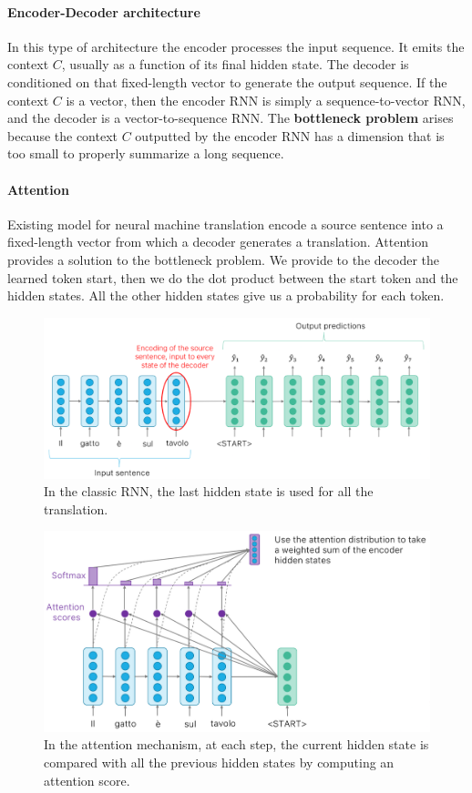 \documentclass{article}
\begin{document}
\paragraph{Encoder-Decoder architecture}
In this type of architecture the encoder processes the input sequence.
It emits the context $C$, usually as a function of its final hidden state.
The decoder is conditioned on that fixed-length vector to generate the output sequence.
If the context $C$ is a vector, then the encoder RNN is simply a sequence-to-vector RNN, and the decoder is a vector-to-sequence RNN.
The \textbf{bottleneck problem} arises because the context $C$ outputted by the encoder RNN has a dimension that is too small to properly summarize a long sequence.

\paragraph{Attention}
Existing model for neural machine translation encode a source sentence into a fixed-length vector from which a decoder generates a translation.
Attention provides a solution to the bottleneck problem. 
We provide to the decoder the learned token start, then we do the dot product between the start token and the hidden states.
All the other hidden states give us a probability for each token.

\begin{figure}[htbp]
  \centering
  \includegraphics[width=0.8\linewidth]{./img/rnn_classic.png}
  \caption{In the classic RNN, the last hidden state is used for all the translation.}
\end{figure}

\begin{figure}[htbp]
  \centering
  \includegraphics[width=0.8\linewidth]{./img/attention.png}
  \caption{In the attention mechanism, at each step, the current hidden state is compared with all the previous hidden states by computing an attention score.}
\end{figure}
\end{document}
